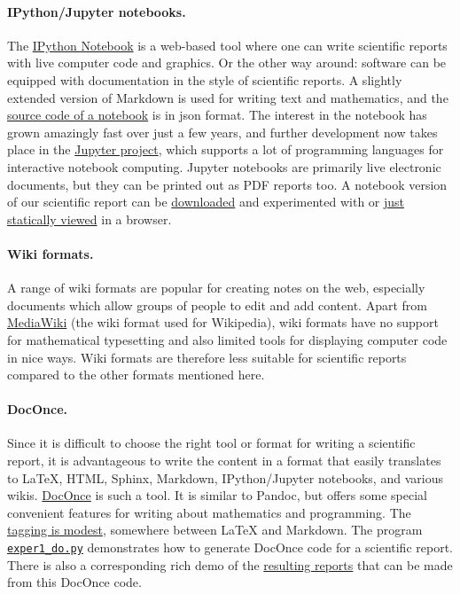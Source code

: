 \documentclass[%
oneside,                 %
final,                   %
10pt]{article}
\begin{document}
\paragraph{IPython/Jupyter notebooks.}
The \href{{http://ipython.org/notebook.html}}{IPython Notebook} is
a web-based tool where one can write scientific reports with live computer
code and graphics. Or the other way around: software can be equipped
with documentation in the style of scientific reports.
A slightly extended version of Markdown is used for writing text and
mathematics, and the \href{{http://tinyurl.com/nc4upel/_static/report.ipynb.html}}{source code of a notebook} is in json format.
The interest in the notebook has grown amazingly fast
over just a few years, and further development now takes place
in the \href{{https://jupyter.org/}}{Jupyter project}, which
supports a lot of programming languages for interactive notebook computing.
Jupyter notebooks are primarily live electronic documents, but they can be
printed out as PDF reports too.
A notebook version of our scientific report can be \href{{http://tinyurl.com/p96acy2/_static/report.ipynb}}{downloaded} and experimented with
or \href{{http://nbviewer.ipython.org/url/hplgit.github.com/teamods/writing_reports/_static/report.ipynb}}{just statically viewed} in a browser.

\paragraph{Wiki formats.}
A range of wiki formats are popular for creating notes on the web,
especially documents which allow groups of people to edit and add
content. Apart from \href{{http://www.mediawiki.org/wiki/MediaWiki}}{MediaWiki} (the wiki format used for
Wikipedia), wiki formats have no support for mathematical typesetting
and also limited tools for displaying computer code in nice ways.
Wiki formats are therefore less suitable for scientific reports compared
to the other formats mentioned here.


\paragraph{DocOnce.}
Since it is difficult to choose the right tool or format for writing a
scientific report, it is advantageous to write the content in a format
that easily translates to {\LaTeX}, HTML, Sphinx, Markdown,
IPython/Jupyter notebooks, and various wikis. \href{{https://github.com/hplgit/doconce}}{DocOnce} is such a tool. It is similar to
Pandoc, but offers some special convenient features for writing about
mathematics and programming.  The \href{{http://tinyurl.com/nc4upel/_static/report.do.txt.html}}{tagging is modest}, somewhere between
{\LaTeX} and Markdown.  The program \href{{http://tinyurl.com/p96acy2/exper1_do.py}}{\nolinkurl{exper1_do.py}} demonstrates how
to generate DocOnce code for a scientific report.
There is also a corresponding rich demo of the \href{{http://tinyurl.com/nc4upel/index.html}}{resulting reports} that can be made from
this DocOnce code.
\end{document}
